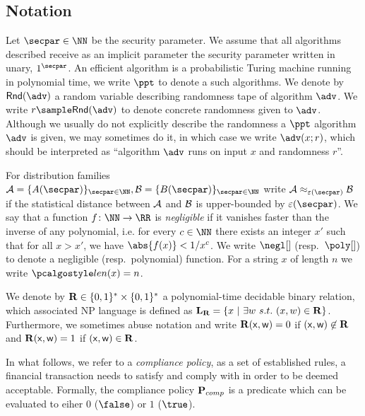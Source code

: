 \documentclass[runningheads,10pt]{llncs}
\numberwithin{equation}{section}
\begin{document}
\subsection{Notation}
Let $\secpar \in \NN$ be the security parameter. We assume that all algorithms
described receive as an implicit parameter the security parameter written in
unary, $1^{\secpar}$. %
An efficient algorithm is a probabilistic Turing machine running in polynomial
time, we write $\ppt$ to denote a such algorithms. We denote by $\rand{\adv}$ a
random variable describing randomness tape of algorithm $\adv$. We write
$r \sample \rand{\adv}$ to denote concrete randomness given to $\adv$. Although
we usually do not explicitly describe the randomness a $\ppt$ algorithm $\adv$
is given, we may sometimes do it, in which case we write $\adv(x; r)$, which
should be interpreted as ``algorithm $\adv$ runs on input $x$ and randomness
$r$''.

For distribution families $\family{A} = \smallset{A(\secpar)}_{\secpar \in
\NN}, \family{B} = \smallset{B(\secpar)}_{\secpar \in \NN}$ write $\family{A}
\approx_{\eps(\secpar)} \family{B}$ if the statistical distance between
$\mathcal{A}$ and $\mathcal{B}$ is upper-bounded by $\eps(\secpar)$. We say that
a function $f\colon \NN \to \RR$ is \emph{negligible} if it vanishes faster
than the inverse of any polynomial, i.e. for every $c \in \NN$ there exists an
integer $x'$ such that for all $x > x'$, we have $\abs{f(x)} < 1/x^c$. We write
$\negl[]$ (resp.~$\poly[]$) to denote a negligible (resp.~polynomial) function.
For a string $x$ of length $n$ we write $\length{x} = n$.

We denote by $\mathbf{R} \in \{0,1\}^{\ast} \times \{0,1\}^{\ast}$ a
polynomial-time decidable binary relation, which associated NP language is
defined as $\LAN_{\REL} = \smallset{x\ |\ \exists w\ s.t.\ (x,w) \in \REL}$.
Furthermore, we sometimes abuse notation and write $\mathbf{R}(\mathsf{x}, \mathsf{w}) = 0$ if
$(\mathsf{x}, \mathsf{w}) \not\in \mathbf{R}$ and $\mathbf{R}(\mathsf{x}, \mathsf{w}) = 1$ if $(\mathsf{x}, \mathsf{w}) \in
\mathbf{R}$.

In what follows, we refer to a \emph{compliance policy}, as a set of
established rules, a financial transaction needs to satisfy and comply with in
order to be deemed acceptable. Formally, the compliance policy $\mathbf{P}_{comp}$ is
a predicate which can be evaluated to eiher $0$ ($\false$) or $1$ ($\true$).
\end{document}
